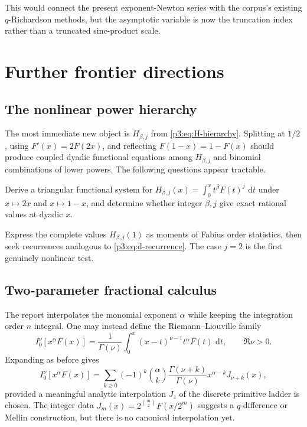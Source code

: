 \documentclass[11pt,oneside]{article}
\theoremstyle{definition}
\theoremstyle{remark}
\newcommand{\dd}{\,\mathrm d}
\newcommand{\1}{\mathbf 1}
\begin{document}
This would connect the present exponent-Newton series with the corpus's existing
$q$-Richardson methods, but the asymptotic variable is now the truncation index rather than a
truncated sinc-product scale.

\section{Further frontier directions}
\label{p3:sec:frontiers}

\subsection{The nonlinear power hierarchy}

The most immediate new object is $H_{\beta,j}$ from \eqref{p3:eq:H-hierarchy}.  Splitting at
$1/2$, using $F'(x)=2F(2x)$, and reflecting $F(1-x)=1-F(x)$ should produce coupled dyadic
functional equations among $H_{\beta,j}$ and binomial combinations of lower powers.  The
following questions appear tractable.

\begin{problem}
Derive a triangular functional system for
\(
H_{\beta,j}(x)=\int_0^x t^\beta F(t)^j\,\dd t
\)
under $x\mapsto2x$ and $x\mapsto1-x$, and determine whether integer $\beta,j$ give exact
rational values at dyadic $x$.
\end{problem}

\begin{problem}
Express the complete values $H_{\beta,j}(1)$ as moments of Fabius order statistics, then
seek recurrences analogous to \eqref{p3:eq:d-recurrence}.  The case $j=2$ is the first genuinely
nonlinear test.
\end{problem}

\subsection{Two-parameter fractional calculus}

The report interpolates the monomial exponent $\alpha$ while keeping the integration order
$n$ integral.  One may instead define the Riemann--Liouville family
\begin{equation}
 I_0^\nu[x^\alpha F(x)]
 =\frac1{\Gamma(\nu)}\int_0^x(x-t)^{\nu-1}t^\alpha F(t)\,\dd t,
 \qquad\Re\nu>0.                                             \label{p3:eq:fractional-order}
\end{equation}
Expanding as before gives
\begin{equation}
 I_0^\nu[x^\alpha F(x)]
 =\sum_{k\ge0}(-1)^k\binom\alpha k
 \frac{\Gamma(\nu+k)}{\Gamma(\nu)}x^{\alpha-k}J_{\nu+k}(x), \label{p3:eq:formal-two-parameter}
\end{equation}
provided a meaningful analytic interpolation $J_z$ of the discrete primitive ladder is
chosen.  The integer data
\(
J_m(x)=2^{\binom m2}F(x/2^m)
\)
suggests a $q$-difference or Mellin construction, but there is no canonical interpolation
yet.
\end{document}
